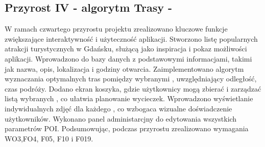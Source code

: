     \subsection{Przyrost IV - algorytm Trasy - }
    \label{sec:przyrost4}
    W ramach czwartego przyrostu projektu zrealizowano kluczowe funkcje zwiększające interaktywność i użyteczność aplikacji. \newline
    \indent Stworzono listę popularnych atrakcji turystycznych w Gdańsku, służącą jako inspiracja i pokaz możliwości aplikacji. \newline
    \indent Wprowadzono do bazy danych  z podstawowymi informacjami, takimi jak nazwa, opis, lokalizacja i godziny otwarcia. \newline
    \indent Zaimplementowano algorytm wyznaczania optymalnych tras pomiędzy wybranymi , uwzględniający odległość, czas podróży. \newline
    \indent Dodano ekran koszyka, gdzie użytkownicy mogą zbierać i zarządzać listą wybranych , co ułatwia planowanie wycieczek. \newline
    \indent Wprowadzono wyświetlanie indywidualnych zdjęć dla każdego , co wzbogaca wizualne doświadczenie użytkowników.\newline
    \indent Wykonano panel administarcjny do edytowania wszystkich parametrów POI.
    Podsumowując, podczas przyrostu zrealizowano wymagania WO3,FO4, F05, F10 i F019.





